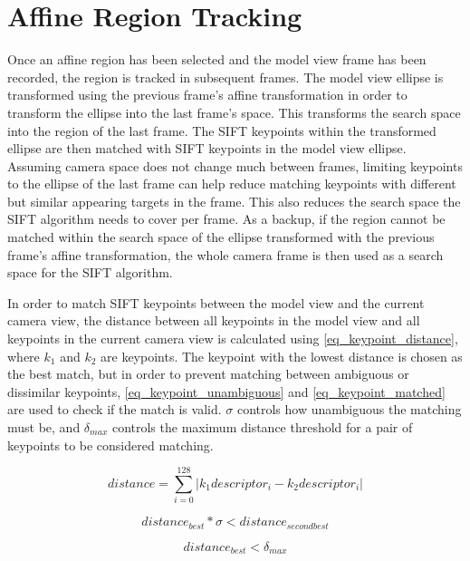 \documentclass[oneside,11pt]{Latex/Classes/PhDthesisPSnPDF}
\begin{document}
\section{Affine Region Tracking}

Once an affine region has been selected and the model view frame has been recorded, the region is tracked in subsequent frames.  The model view ellipse is transformed using the previous frame's affine transformation in order to transform the ellipse into the last frame's space.  This transforms the search space into the region of the last frame.  The SIFT keypoints within the transformed ellipse are then matched with SIFT keypoints in the model view ellipse.  Assuming camera space does not change much between frames, limiting keypoints to the ellipse of the last frame can help reduce matching keypoints with different but similar appearing targets in the frame.  This also reduces the search space the SIFT algorithm needs to cover per frame.  As a backup, if the region cannot be matched within the search space of the ellipse transformed with the previous frame's affine transformation, the whole camera frame is then used as a search space for the SIFT algorithm.

In order to match SIFT keypoints between the model view and the current camera view, the distance between all keypoints in the model view and all keypoints in the current camera view is calculated using \ref{eq_keypoint_distance}, where $k_1$ and $k_2$ are keypoints.  The keypoint with the lowest distance is chosen as the best match, but in order to prevent matching between ambiguous or dissimilar keypoints, \ref{eq_keypoint_unambiguous} and \ref{eq_keypoint_matched} are used to check if the match is valid. $\sigma$ controls how unambiguous the matching must be, and $\delta_{max}$ controls the maximum distance threshold for a pair of keypoints to be considered matching.

\begin{equation} 
\label{eq_keypoint_distance}
distance = \displaystyle\sum\limits_{i=0}^{128} |k_1 descriptor_i - k_2 descriptor_i|
\end{equation}

\begin{equation} 
\label{eq_keypoint_unambiguous}
distance_{best} * \sigma < distance_{second best}
\end{equation}

\begin{equation} 
\label{eq_keypoint_matched}
distance_{best} < \delta_{max}
\end{equation}
\end{document}

